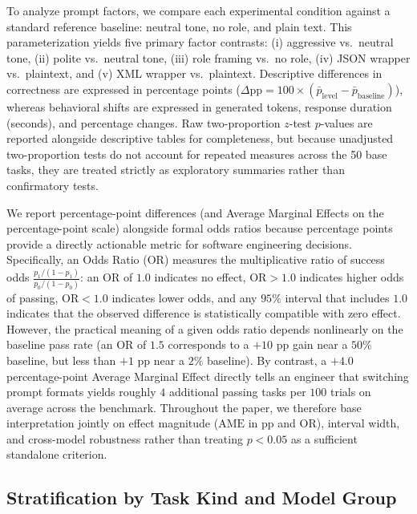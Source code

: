 \documentclass[a4paper,fleqn]{cas-sc}
\begin{document}
To analyze prompt factors, we compare each experimental condition against a standard reference baseline: neutral tone, no role, and plain text. This parameterization yields five primary factor contrasts: (i) aggressive vs.\ neutral tone, (ii) polite vs.\ neutral tone, (iii) role framing vs.\ no role, (iv) JSON wrapper vs.\ plaintext, and (v) XML wrapper vs.\ plaintext. Descriptive differences in correctness are expressed in percentage points ($\Delta\text{pp} = 100 \times (\bar{p}_{\text{level}} - \bar{p}_{\text{baseline}})$), whereas behavioral shifts are expressed in generated tokens, response duration (seconds), and percentage changes. Raw two-proportion $z$-test $p$-values are reported alongside descriptive tables for completeness, but because unadjusted two-proportion tests do not account for repeated measures across the 50 base tasks, they are treated strictly as exploratory summaries rather than confirmatory tests.

We report percentage-point differences (and Average Marginal Effects on the percentage-point scale) alongside formal odds ratios because percentage points provide a directly actionable metric for software engineering decisions. Specifically, an Odds Ratio ($\text{OR}$) measures the multiplicative ratio of success odds $\frac{p_1 / (1 - p_1)}{p_0 / (1 - p_0)}$: an $\text{OR}$ of $1.0$ indicates no effect, $\text{OR} > 1.0$ indicates higher odds of passing, $\text{OR} < 1.0$ indicates lower odds, and any $95\%$ interval that includes $1.0$ indicates that the observed difference is statistically compatible with zero effect. However, the practical meaning of a given odds ratio depends nonlinearly on the baseline pass rate (an $\text{OR}$ of $1.5$ corresponds to a $+10\text{ pp}$ gain near a $50\%$ baseline, but less than $+1\text{ pp}$ near a $2\%$ baseline). By contrast, a $+4.0$ percentage-point Average Marginal Effect directly tells an engineer that switching prompt formats yields roughly $4$ additional passing tasks per $100$ trials on average across the benchmark. Throughout the paper, we therefore base interpretation jointly on effect magnitude ($\text{AME}$ in pp and $\text{OR}$), interval width, and cross-model robustness rather than treating $p < 0.05$ as a sufficient standalone criterion.

\subsection{Stratification by Task Kind and Model Group}\label{stratification-by-task-kind-and-model-group}
\end{document}
